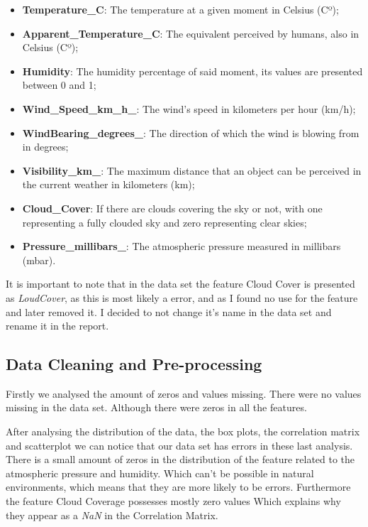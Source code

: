\documentclass[conference]{IEEEtran}
\begin{document}
\begin{itemize}
    \item \textbf{Temperature\_C}: The temperature at a given moment in Celsius (Cº);
    \item \textbf{Apparent\_Temperature\_C}: The equivalent perceived by humans, also in Celsius (Cº);
    \item \textbf{Humidity}: The humidity percentage of said moment, its values are presented between 0 and 1;
    \item \textbf{Wind\_Speed\_km\_h\_}: The wind's speed in kilometers per hour (km/h);
    \item \textbf{WindBearing\_degrees\_}: The direction of which the wind is blowing from in degrees;
    \item \textbf{Visibility\_km\_}: The maximum distance that an object can be perceived in the current weather in kilometers (km);
    \item \textbf{Cloud\_Cover}: If there are clouds covering the sky or not, with one representing a fully clouded sky and zero representing clear skies;
    \item \textbf{Pressure\_millibars\_}: The atmospheric pressure measured in millibars (mbar).

\end{itemize}

It is important to note that in the data set the feature Cloud Cover is presented as \textit{LoudCover}, as this is most likely a error, and as I found no use for the feature and later removed it. I decided to not change it's name in the data set and rename it in the report. 

\subsection{Data Cleaning and Pre-processing}

Firstly we analysed the amount of zeros and values missing. There were no values missing in the data set. Although there were zeros in all the features.

After analysing the distribution of the data, the box plots, the correlation matrix and scatterplot we can notice that our data set has errors in these last analysis. There is a small amount of zeros in the distribution of the feature related to the atmospheric pressure and humidity. Which can't be possible in natural environments, which means that they are more likely to be errors. Furthermore the feature Cloud Coverage possesses mostly zero values Which explains why they appear as a \textit{NaN} in the Correlation Matrix.
\end{document}
